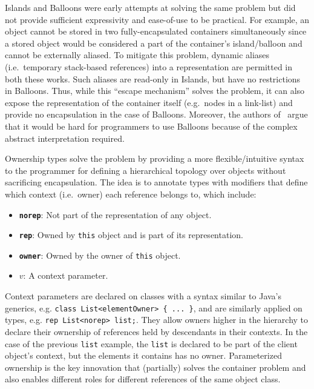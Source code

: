 \documentclass{acm_proc_article-sp}
\begin{document}
Islands and Balloons were early attempts at solving the same problem but did
not provide sufficient expressivity and ease-of-use to be practical. For
example, an object cannot be stored in two fully-encapsulated containers
simultaneously since a stored object would be considered a part of the
container's island/balloon and cannot be externally aliased. To mitigate this
problem, dynamic aliases (i.e.\ temporary stack-based references) into a
representation are permitted in both these works. Such aliases are read-only in
Islands, but have no restrictions in Balloons. Thus, while this ``escape
mechanism'' solves the problem, it can also expose the representation of the
container itself (e.g.\ nodes in a link-list) and provide no encapsulation in
the case of Balloons. Moreover, the authors of~\cite{noble98alias} argue that
it would be hard for programmers to use Balloons because of the complex
abstract interpretation required.

Ownership types solve the problem by providing a more flexible/intuitive syntax
to the programmer for defining a hierarchical topology over objects without
sacrificing encapsulation. The idea is to annotate types with modifiers
that define which context (i.e.\ owner) each reference belongs to, which
include:
\begin{itemize}
	\item \textbf{\lstinline|norep|}:
		Not part of the representation of any object.
	\item \textbf{\lstinline|rep|}:
		Owned by \lstinline|this| object and is part of its representation.
	\item \textbf{\lstinline|owner|}:
		Owned by the owner of \lstinline|this| object.
	\item \textbf{$v$}:
		A context parameter.
\end{itemize}

Context parameters are declared on classes with a syntax similar to Java's
generics, e.g. \lstinline|class List<elementOwner> { ... }|, and are similarly
applied on types, e.g. \lstinline|rep List<norep> list;|. They allow owners
higher in the hierarchy to declare their ownership of references held by
descendants in their contexts. In the case of the previous \lstinline|list|
example, the \lstinline|list| is declared to be part of the client object's
context, but the elements it contains has no owner. Parameterized ownership is
the key innovation that (partially) solves the container problem and also
enables different roles for different references of the same object class.
\end{document}
